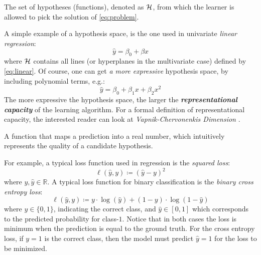 \begin{definition}
	The set of hypotheses (functions), denoted as $\mathcal{H}$, from which the
	learner is allowed to pick the solution of \Equation{} \ref{eq:problem}.
\end{definition}

A simple example of a hypothesis space, is the one used in univariate
\emph{linear regression}:
\begin{equation}
	\label{eq:linear}
	\hat{y} = \beta_0 + \beta x
\end{equation}
where $\mathcal{H}$ contains all lines (or hyperplanes in the multivariate case)
defined by \Equation{} \ref{eq:linear}. Of course, one can get \emph{a
more expressive} hypothesis space, by including polynomial terms, e.g.:
\begin{equation}
	\label{eq:polynomial}
	\hat{y} = \beta_0 + \beta_1 x + \beta_2 x^2
\end{equation}
The more expressive the hypothesis space, the larger the
\emph{\textbf{representational capacity}} of
the learning algorithm. For a formal definition of representational capacity,
the interested reader can look at \emph{Vapnik-Chervonenkis
Dimension} \parencite{Hastie2009}.

\begin{definition}
	A function that maps a prediction into a real number, which intuitively
	represents the quality of a candidate hypothesis.
\end{definition}

For example, a typical loss function used in regression is the \emph{squared
loss}:
\begin{equation}
	\label{eq:squared_loss}
	\ell(\hat{y}, y) \coloneqq (\hat{y} - y)^2
\end{equation}
where $y, \hat{y} \in \mathbb{R}$. A typical loss function for binary
classification is the \emph{binary cross entropy
loss}:
\begin{equation}
	\label{eq:cross_entropy}
	\ell(\hat{y}, y) \coloneqq y \cdot \log (\hat{y})
	+ (1 - y) \cdot \log (1 - \hat{y})
\end{equation}
where $y \in \{0, 1\}$, indicating the correct class, and $\hat{y} \in [0, 1]$
which corresponds to the predicted probability for class-$1$. Notice that in
both cases the loss is minimum when the prediction is equal to the ground truth.
For the cross entropy loss, if $y=1$ is the correct class, then the model must
predict $\hat{y}=1$ for the loss to be minimized.

